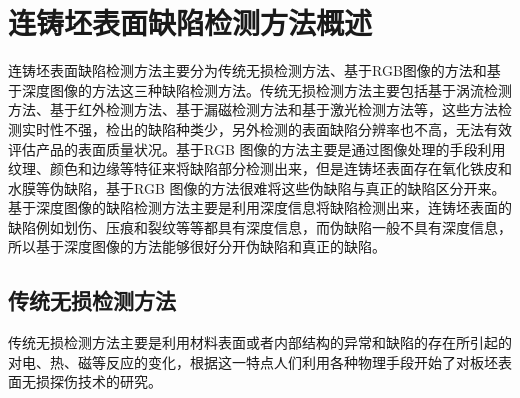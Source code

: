 ﻿%
%
%
%
%
%

\chapter{连铸坯表面缺陷检测方法概述}
连铸坯表面缺陷检测方法主要分为传统无损检测方法、基于RGB图像的方法和基于深度图像的方法这三种缺陷检测方法。传统无损检测方法主要包括基于涡流检测方法、基于红外检测方法、基于漏磁检测方法和基于激光检测方法等，这些方法检测实时性不强，检出的缺陷种类少，另外检测的表面缺陷分辨率也不高，无法有效评估产品的表面质量状况。基于RGB 图像的方法主要是通过图像处理的手段利用纹理、颜色和边缘等特征来将缺陷部分检测出来，但是连铸坯表面存在氧化铁皮和水膜等伪缺陷，基于RGB 图像的方法很难将这些伪缺陷与真正的缺陷区分开来。基于深度图像的缺陷检测方法主要是利用深度信息将缺陷检测出来，连铸坯表面的缺陷例如划伤、压痕和裂纹等等都具有深度信息，而伪缺陷一般不具有深度信息，所以基于深度图像的方法能够很好分开伪缺陷和真正的缺陷。

    \section{传统无损检测方法}
    传统无损检测方法主要是利用材料表面或者内部结构的异常和缺陷的存在所引起的对电、热、磁等反应的变化，根据这一特点人们利用各种物理手段开始了对板坯表面无损探伤技术的研究。

